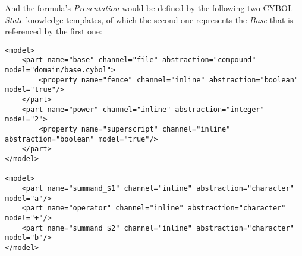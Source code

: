 And the formula's \emph{Presentation} would be defined by the following two
CYBOL \emph{State} knowledge templates, of which the second one represents the
\emph{Base} that is referenced by the first one:

\begin{scriptsize}
    \begin{verbatim}
<model>
    <part name="base" channel="file" abstraction="compound" model="domain/base.cybol">
        <property name="fence" channel="inline" abstraction="boolean" model="true"/>
    </part>
    <part name="power" channel="inline" abstraction="integer" model="2">
        <property name="superscript" channel="inline" abstraction="boolean" model="true"/>
    </part>
</model>

<model>
    <part name="summand_$1" channel="inline" abstraction="character" model="a"/>
    <part name="operator" channel="inline" abstraction="character" model="+"/>
    <part name="summand_$2" channel="inline" abstraction="character" model="b"/>
</model>
    \end{verbatim}
\end{scriptsize}
